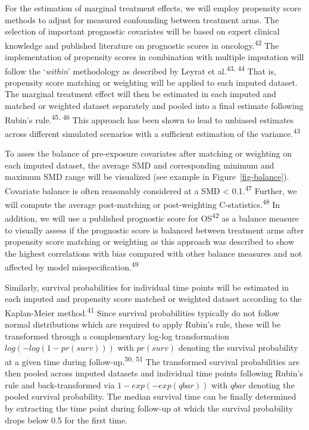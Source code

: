\documentclass[
  letterpaper,
  DIV=11,
  numbers=noendperiod]{scrartcl}
\begin{document}
For the estimation of marginal treatment effects, we will employ
propensity score methods to adjust for measured confounding between
treatment arms. The selection of important prognostic covariates will be
based on expert clinical knowledge and published literature on
prognostic scores in oncology.\textsuperscript{42} The implementation of
propensity scores in combination with multiple imputation will follow
the `\emph{within}' methodology as described by Leyrat et
al.\textsuperscript{43, 44} That is, propensity score matching or
weighting will be applied to each imputed dataset. The marginal
treatment effect will then be estimated in each imputed and matched or
weighted dataset separately and pooled into a final estimate following
Rubin's rule.\textsuperscript{45, 46} This approach has been shown to
lead to unbiased estimates across different simulated scenarios with a
sufficient estimation of the variance.\textsuperscript{43}

To asses the balance of pre-exposure covariates after matching or
weighting on each imputed dataset, the average SMD and corresponding
minimum and maximum SMD range will be visualized (see example in
Figure~\ref{fig-balance}). Covariate balance is often reasonably
considered at a SMD \textless{} 0.1.\textsuperscript{47} Further, we
will compute the average post-matching or post-weighting
C-statistics.\textsuperscript{48} In addition, we will use a published
prognostic score for OS\textsuperscript{42} as a balance measure to
visually assess if the prognostic score is balanced between treatment
arms after propensity score matching or weighting as this approach was
described to show the highest correlations with bias compared with other
balance measures and not affected by model
misspecification.\textsuperscript{49}

Similarly, survival probabilities for individual time points will be
estimated in each imputed and propensity score matched or weighted
dataset according to the Kaplan-Meier method.\textsuperscript{41} Since
survival probabilities typically do not follow normal distributions
which are required to apply Rubin's rule, these will be transformed
through a complementary log-log transformation \(log(-log(1-pr(surv)))\)
with \(pr(surv)\) denoting the survival probability at a given time
during follow-up.\textsuperscript{50, 51} The transformed survival
probabilities are then pooled across imputed datasets and individual
time points following Rubin's rule and back-transformed via
\(1-exp(-exp(qbar))\) with \(qbar\) denoting the pooled survival
probability. The median survival time can be finally determined by
extracting the time point during follow-up at which the survival
probability drops below 0.5 for the first time.
\end{document}
